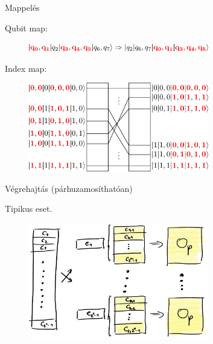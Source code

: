 \documentclass[aspectratio=169]{beamer}
\begin{document}
\begin{frame}{Mappelés}

Qubit map:

\begin{figure}[H]
    \centering
    \includegraphics[width=0.7\textwidth]{figures/qubit_mapping.png}
\end{figure}

Index map:

\begin{figure}[H]
  \centering
  \includegraphics[width=0.7\textwidth]{figures/index_mapping.png}
\end{figure}

\end{frame}


\begin{frame}{Végrehajtás (párhuzamosíthatóan)}

Tipikus eset.

\begin{figure}[H]
    \centering
    \includegraphics[width=0.7\textwidth]{figures/vegrehajtas.jpg}
\end{figure}

\end{frame}
\end{document}
